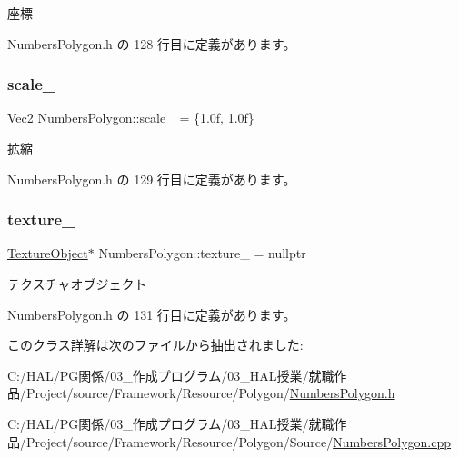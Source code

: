座標 



 Numbers\+Polygon.\+h の 128 行目に定義があります。

\mbox{\label{class_numbers_polygon_a4f2f048ac2e1e8b90079bcce54dfce50}} 
\subsubsection{\texorpdfstring{scale\+\_\+}{scale\_}}
{\footnotesize\ttfamily \mbox{\hyperlink{_vector3_d_8h_a5ef6e95dfc5f9d3820b71772d99bbc25}{Vec2}} Numbers\+Polygon\+::scale\+\_\+ = \{1.\+0f, 1.\+0f\}\hspace{0.3cm}{\ttfamily [private]}}



拡縮 



 Numbers\+Polygon.\+h の 129 行目に定義があります。

\mbox{\label{class_numbers_polygon_ae0c6d86da1010bcc128666e60c49c7f8}} 
\subsubsection{\texorpdfstring{texture\+\_\+}{texture\_}}
{\footnotesize\ttfamily \mbox{\hyperlink{class_texture_object}{Texture\+Object}}$\ast$ Numbers\+Polygon\+::texture\+\_\+ = nullptr\hspace{0.3cm}{\ttfamily [private]}}



テクスチャオブジェクト 



 Numbers\+Polygon.\+h の 131 行目に定義があります。



このクラス詳解は次のファイルから抽出されました\+:\begin{DoxyCompactItemize}
\item 
C\+:/\+H\+A\+L/\+P\+G関係/03\+\_\+作成プログラム/03\+\_\+\+H\+A\+L授業/就職作品/\+Project/source/\+Framework/\+Resource/\+Polygon/\mbox{\hyperlink{_numbers_polygon_8h}{Numbers\+Polygon.\+h}}\item 
C\+:/\+H\+A\+L/\+P\+G関係/03\+\_\+作成プログラム/03\+\_\+\+H\+A\+L授業/就職作品/\+Project/source/\+Framework/\+Resource/\+Polygon/\+Source/\mbox{\hyperlink{_numbers_polygon_8cpp}{Numbers\+Polygon.\+cpp}}\end{DoxyCompactItemize}
